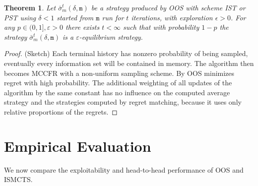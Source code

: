 \documentclass{aamas2015}
\newcommand{\ttm}{\mathtt{m}}
\newtheorem{theorem}{Theorem}
\begin{document}
\begin{theorem}
Let $\bar{\sigma}^t_m(\delta,\ttm)$ be a strategy produced by OOS with scheme IST or PST using $\delta < 1$ started from $\ttm$ run for $t$ iterations, with exploration $\epsilon > 0$. 
For any $p \in (0, 1], \varepsilon > 0$ there exists $t < \infty$ such that with 
probability $1-p$ the strategy $\bar{\sigma}^t_m(\delta,\ttm)$ is a $\varepsilon$-equilibrium strategy. 
\label{thm:consistency}
\end{theorem}
\begin{proof}(Sketch) Each terminal history has nonzero probability of being sampled, eventually every information 
set will be contained in memory. The algorithm then becomes MCCFR with a non-uniform sampling scheme.
By \cite[Theorem 5]{Lanctot09Sampling} OOS minimizes regret with high probability. The additional weighting of all updates of the algorithm by the same constant has no influence on the computed average strategy and the strategies computed by regret matching, because it uses only relative proportions of the regrets.
\end{proof}


\section{Empirical Evaluation}

We now compare the exploitability and head-to-head 
performance
of OOS and ISMCTS. %
\end{document}
